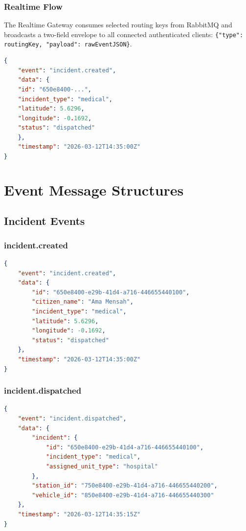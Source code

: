 \documentclass[12pt,a4paper]{report}
\begin{document}
\subsection{Realtime Flow}
The Realtime Gateway consumes selected routing keys from RabbitMQ and broadcasts a two-field envelope to all connected authenticated clients: \texttt{\{"type": routingKey, "payload": rawEventJSON\}}.

\begin{lstlisting}[language=JSON, caption=Sample Event Message]
{
	"event": "incident.created",
	"data": {
	"id": "650e8400-...",
	"incident_type": "medical",
	"latitude": 5.6296,
	"longitude": -0.1692,
	"status": "dispatched"
	},
	"timestamp": "2026-03-12T14:35:00Z"
}
\end{lstlisting}

\newpage

\chapter{Event Message Structures}

\section{Incident Events}

\subsection{incident.created}
\begin{lstlisting}[language=JSON, caption=incident.created Event]
{
	"event": "incident.created",
	"data": {
		"id": "650e8400-e29b-41d4-a716-446655440100",
		"citizen_name": "Ama Mensah",
		"incident_type": "medical",
		"latitude": 5.6296,
		"longitude": -0.1692,
		"status": "dispatched"
	},
	"timestamp": "2026-03-12T14:35:00Z"
}
\end{lstlisting}

\subsection{incident.dispatched}
\begin{lstlisting}[language=JSON, caption=incident.dispatched Event]
{
	"event": "incident.dispatched",
	"data": {
		"incident": {
			"id": "650e8400-e29b-41d4-a716-446655440100",
			"incident_type": "medical",
			"assigned_unit_type": "hospital"
		},
		"station_id": "750e8400-e29b-41d4-a716-446655440200",
		"vehicle_id": "850e8400-e29b-41d4-a716-446655440300"
	},
	"timestamp": "2026-03-12T14:35:15Z"
}
\end{lstlisting}
\end{document}
